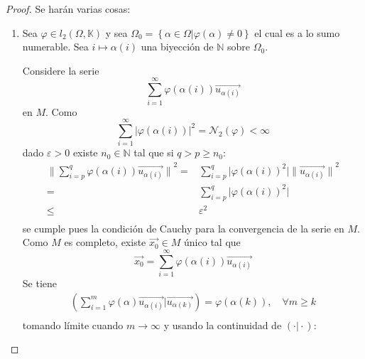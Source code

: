\documentclass[12pt]{report}
\theoremstyle{largebreak}
\newcommand\abs[1]{\ensuremath{\big|#1\big|}}
\newcommand\norm[1]{\ensuremath{\|#1\|}}
\newcommand\pint[2]{\ensuremath{\left(#1\big| #2\right)}}
\begin{document}
    \begin{proof}
        Se harán varias cosas:
        \begin{enumerate}
            \item Sea $\varphi\in l_2(\Omega,\mathbb{K})$ y sea $\Omega_0=\left\{\alpha\in\Omega\Big|\varphi(\alpha)\neq0 \right\}$ el cual es a lo sumo numerable. Sea $i\mapsto\alpha(i)$ una biyección de $\mathbb{N}$ sobre $\Omega_0$.
            
            Considere la serie
            \begin{equation*}
                \sum_{i=1} ^{\infty}\varphi(\alpha(i))\vec{u_{\alpha(i)}}
            \end{equation*}
            en $M$. Como
            \begin{equation*}
                \sum_{i=1}^{\infty}\abs{\varphi(\alpha(i))}^2=\mathcal{N}_2(\varphi)<\infty
            \end{equation*}
            dado $\varepsilon>0$ existe $n_0\in\mathbb{N}$ tal que si $q>p\geq n_0$:
            \begin{equation*}
                \begin{split}
                    \norm{\sum_{i=p }^{q}\varphi(\alpha(i))\vec{u_{\alpha(i)}}}^2
                    =&\sum_{i=p }^{q}\abs{\varphi(\alpha(i))^2}\norm{\vec{u_{\alpha(i)}}}^2 \\
                    =&\sum_{i=p }^{q}\abs{\varphi(\alpha(i))^2}\\
                    \leq&\varepsilon^2 \\
                \end{split}
            \end{equation*}
            se cumple pues la condición de Cauchy para la convergencia de la serie en $M$. Como $M$ es completo, existe $\vec{x_0}\in M$ único tal que
            \begin{equation*}
                \vec{x_0}=\sum_{i=1} ^{\infty}\varphi(\alpha(i))\vec{u_{\alpha(i)}}
            \end{equation*}
            Se tiene
            \begin{equation*}
                \begin{split}
                    \pint{\sum_{i=1 }^{m}\varphi(\alpha)\vec{u_{\alpha(i)}}}{\vec{u_{\alpha(k)}}}=\varphi(\alpha(k)),\quad\forall m\geq k \\
                \end{split}
            \end{equation*}
            tomando límite cuando $m\rightarrow\infty$ y usando la continuidad de $\pint{\cdot}{\cdot}$:

\end{enumerate}
\end{proof}
\end{document}
